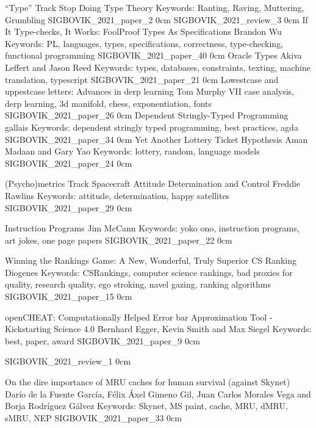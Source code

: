 \addtrack
    {}{``Type'' Track}
\addpaper
    {Stop Doing Type Theory}
    {}
    {Keywords: Ranting, Raving, Muttering, Grumbling}
    {SIGBOVIK_2021_paper_2}
    {0cm}
    {}
\addreview
    {SIGBOVIK_2021_review_3}
    {0cm}
\addpaper
    {If It Type-checks, It Works: FoolProof Types As Specifications}
    {Brandon Wu}
    {Keywords: PL, languages, types, specifications, correctness, type-checking, functional programming}
    {SIGBOVIK_2021_paper_40}
    {0cm}
    {}
\addpaper
    {Oracle Types}
    {Akiva Leffert and Jason Reed}
    {Keywords: types, databases, constraints, texting, machine translation, typescript}
    {SIGBOVIK_2021_paper_21}
    {0cm}
    {}
\addpaper
    {Lowestcase and uppestcase letters: Advances in derp learning}
    {Tom Murphy VII}
    {case analysis, derp learning, 3d manifold, chess, exponentiation, fonts}
    {SIGBOVIK_2021_paper_26}
    {0cm}
    {}
\addpaper
    {Dependent Stringly-Typed Programming}
    {gallais}
    {Keywords: dependent stringly typed programming, best practices, agda}
    {SIGBOVIK_2021_paper_34}
    {0cm}
    {}
\addpaper
    {Yet Another Lottery Ticket Hypothesis}
    {Aman Madaan and Gary Yao}
    {Keywords: lottery, random, language models}
    {SIGBOVIK_2021_paper_24}
    {0cm}
    {}

\addtrack
    {}{(Psycho)metrics Track}
\addpaper
    {Spacecraft Attitude Determination and Control}
    {Freddie Rawlins}
    {Keywords: attitude, determination, happy satellites}
    {SIGBOVIK_2021_paper_29}
    {0cm}
    {}

\addpaper
    {Instruction Programs}
    {Jim McCann}
    {Keywords: yoko ono, instruction programs, art jokes, one page papers}
    {SIGBOVIK_2021_paper_22}
    {0cm}
    {}

\addpaper
    {Winning the Rankings Game: A New, Wonderful, Truly Superior CS Ranking}
    {Diogenes}
    {Keywords: CSRankings, computer science rankings, bad proxies for quality, research quality, ego stroking, navel gazing, ranking algorithms}
    {SIGBOVIK_2021_paper_15}
    {0cm}
    {}

\addpaper
    {openCHEAT: Computationally Helped Error bar Approximation Tool - Kickstarting Science 4.0}
    {Bernhard Egger, Kevin Smith and Max Siegel} %
    {Keywords: best, paper, award}
    {SIGBOVIK_2021_paper_9}
    {0cm}
    {}


\addreview
    {SIGBOVIK_2021_review_1}
    {0cm}


\addpaper
    {On the dire importance of MRU caches for human survival (against Skynet)}
    {Darío de la Fuente García, Félix Áxel Gimeno Gil, Juan Carlos Morales Vega and Borja Rodríguez Gálvez}
    {Keywords: Skynet, MS paint, cache, MRU, dMRU, sMRU, NEP}
    {SIGBOVIK_2021_paper_33}
    {0cm}
    {}


